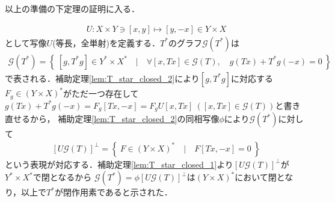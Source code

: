 	以上の準備の下定理の証明に入る．
	\begin{prf}
		\begin{align}
			U : X \times Y \ni [x,y] \longmapsto [y,-x] \in Y \times X
		\end{align}
		として写像$U$(等長，全単射)を定義する．$T^*$のグラフ$\mathscr{G}(T^*)$は
		\begin{align}
			\mathscr{G}(T^*) = \left\{\ [g,T^*g] \in Y^* \times X^*\quad |\quad \forall [x,Tx] \in \mathscr{G}(T),\quad g(Tx) + T^*g(-x) = 0\ \right\}
		\end{align}
		で表される．補助定理\ref{lem:T_star_closed_2}により$[g,T^*g]$に対応する$F_g \in (Y \times X)^*$がただ一つ存在して
		$g(Tx) + T^*g(-x) = F_g[Tx,-x] = F_gU[x,Tx]\ ([x,Tx] \in \mathscr{G}(T))$と書き直せるから，
		補助定理\ref{lem:T_star_closed_2}の同相写像$\phi$により$\mathscr{G}(T^*)$に対して
		\begin{align}
			\left[U\mathscr{G}(T) \right]^{\perp} = \left\{\ F \in (Y \times X)^*\quad |\quad F[Tx,-x] = 0\ \right\}
		\end{align}
		という表現が対応する．補助定理\ref{lem:T_star_closed_1}より$\left[U\mathscr{G}(T) \right]^{\perp}$が$Y^* \times X^*$で閉となるから
		$\mathscr{G}(T^*) = \phi \left[U\mathscr{G}(T) \right]^{\perp}$は$(Y \times X)^*$において閉となり，以上で$T^*$が閉作用素であると示された．
		\QED
	\end{prf}
	
	
	